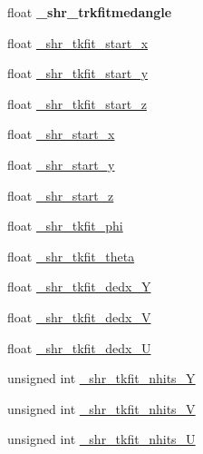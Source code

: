 \begin{DoxyCompactItemize}
\item 
float {\bfseries \+\_\+shr\+\_\+trkfitmedangle}\hypertarget{classselection_1_1CC0piNpSelection_a7e28bdd93b290f347c1aabdfff40b540}{}\label{classselection_1_1CC0piNpSelection_a7e28bdd93b290f347c1aabdfff40b540}

\item 
float \hyperlink{classselection_1_1CC0piNpSelection_a44002e3cc4d16dce6e6f61ee3a2bae6a}{\+\_\+shr\+\_\+tkfit\+\_\+start\+\_\+x}
\item 
float \hyperlink{classselection_1_1CC0piNpSelection_acd1826c44855b71bce92253f7ac1a758}{\+\_\+shr\+\_\+tkfit\+\_\+start\+\_\+y}
\item 
float \hyperlink{classselection_1_1CC0piNpSelection_a4d3591a8bb7abd9e320f35ca3bf311c2}{\+\_\+shr\+\_\+tkfit\+\_\+start\+\_\+z}
\item 
float \hyperlink{classselection_1_1CC0piNpSelection_ac0fb4dbd656f2f3fb2c12ffc02a0df7c}{\+\_\+shr\+\_\+start\+\_\+x}
\item 
float \hyperlink{classselection_1_1CC0piNpSelection_ade6717f479b053a2c2c9082e597d599f}{\+\_\+shr\+\_\+start\+\_\+y}
\item 
float \hyperlink{classselection_1_1CC0piNpSelection_a6e8b4637c8de2991e4d48291d3e90ddf}{\+\_\+shr\+\_\+start\+\_\+z}
\item 
float \hyperlink{classselection_1_1CC0piNpSelection_aefb0bc61c417330a448ababb5363ad8f}{\+\_\+shr\+\_\+tkfit\+\_\+phi}
\item 
float \hyperlink{classselection_1_1CC0piNpSelection_a11df391e482434665c389423bbb9ec5d}{\+\_\+shr\+\_\+tkfit\+\_\+theta}
\item 
float \hyperlink{classselection_1_1CC0piNpSelection_ababbbc32babdef645c2edc613713ceb7}{\+\_\+shr\+\_\+tkfit\+\_\+dedx\+\_\+Y}
\item 
float \hyperlink{classselection_1_1CC0piNpSelection_a428fc549513bea0e1ca92cf90c1148cd}{\+\_\+shr\+\_\+tkfit\+\_\+dedx\+\_\+V}
\item 
float \hyperlink{classselection_1_1CC0piNpSelection_aaaef69409457695e2300bf847a13804c}{\+\_\+shr\+\_\+tkfit\+\_\+dedx\+\_\+U}
\item 
unsigned int \hyperlink{classselection_1_1CC0piNpSelection_ae3a53326b19594013c9df08b66ccaa73}{\+\_\+shr\+\_\+tkfit\+\_\+nhits\+\_\+Y}
\item 
unsigned int \hyperlink{classselection_1_1CC0piNpSelection_adab23c54dd799cdf83c31a10e4ae9061}{\+\_\+shr\+\_\+tkfit\+\_\+nhits\+\_\+V}
\item 
unsigned int \hyperlink{classselection_1_1CC0piNpSelection_a6c75f5783174133ce97849f128f3dee3}{\+\_\+shr\+\_\+tkfit\+\_\+nhits\+\_\+U}

\end{DoxyCompactItemize}
